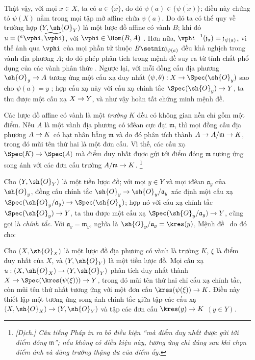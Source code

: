 \documentclass[oneside]{amsart}
\makeatletter
\newcommand{\ega@arrow}[2]{\mathchoice{#1}{#2}{#2}{#2}}
\renewcommand{\to}{\ega@arrow{\longrightarrow}{\rightarrow}}
\newcommand{\oldpage}[2][]{{\marginnote{\normalfont\textbf{#1}~|~#2}}\ignorespaces}
\let\EGAOriginalLabel\label
\renewcommand{\label}[1]{\phantomsection\EGAOriginalLabel{#1}}
\makeatother
\begin{document}
Thật vậy, với mọi $x\in X$, ta có $a\in\overline{\{x\}}$, do đó
$\psi(a)\in\overline{\{\psi(x)\}}$; điều này chứng tỏ $\psi(X)$ nằm
trong mọi tập mở affine chứa $\psi(a)$. Do đó ta có thể quy về trường
hợp $(Y,\sh{O}_Y)$ là một lược đồ affine có vành $B$; khi đó
$u=({}^a\vphi,\widetilde{\vphi})$, với $\vphi\in\Hom(B,A)$
. Hơn nữa,
$\vphi^{-1}(\mathfrak{j}_a)=\mathfrak{j}_{\psi(a)}$, vì thế ảnh qua
$\vphi$ của mọi phần tử thuộc $B\setmin\mathfrak{j}_{\psi(a)}$ đều khả
nghịch trong vành địa phương $A$; do đó phép phân tích trong mệnh đề suy
ra từ tính chất phổ dụng của các vành phân thức
. Ngược lại, với mỗi đồng cấu địa phương
$\sh{O}_y\to A$ tương ứng một cấu xạ duy nhất
$(\psi,\theta):X\to\Spec(\sh{O}_y)$ sao cho $\psi(a)=y$
; hợp cấu xạ này với cấu xạ chính tắc
$\Spec(\sh{O}_y)\to Y$, ta thu được một cấu xạ $X\to Y$, và như vậy
hoàn tất chứng minh mệnh đề.

\begin{env}[2.4.5]
\label{I.2.4.5}
Các lược đồ affine có vành là một \emph{trường} $K$ đều có không gian
nền chỉ gồm một điểm. Nếu $A$ là một vành địa phương có iđêan cực đại
$\mathfrak{m}$, thì mọi đồng cấu địa phương $A\to K$ có hạt nhân bằng
$\mathfrak{m}$ và do đó phân tích thành
$A\to A/\mathfrak{m}\to K$, trong đó mũi tên thứ hai là một đơn cấu. Vì
thế, các cấu xạ $\Spec(K)\to\Spec(A)$ mà điểm duy nhất được gửi tới điểm
đóng $\mathfrak{m}$ tương ứng song ánh với các đơn cấu trường
$A/\mathfrak{m}\to K$.
\footnote{\emph{[Dịch.] Câu tiếng Pháp in ra bỏ điều kiện ``mà điểm duy
nhất được gửi tới điểm đóng $\mathfrak{m}$''; nếu không có điều kiện
này, tương ứng chỉ đúng sau khi chọn điểm ảnh và dùng trường thặng dư
của điểm ấy.}}
\end{env}

Cho $(Y,\sh{O}_Y)$ là một tiền lược đồ; với mọi $y\in Y$ và mọi iđêan
$\mathfrak{a}_y$ của $\sh{O}_y$, đồng cấu chính tắc
$\sh{O}_y\to\sh{O}_y/\mathfrak{a}_y$ xác định một cấu xạ
$\Spec(\sh{O}_y/\mathfrak{a}_y)\to\Spec(\sh{O}_y)$; hợp nó với cấu xạ
chính tắc $\Spec(\sh{O}_y)\to Y$, ta thu được một cấu xạ
$\Spec(\sh{O}_y/\mathfrak{a}_y)\to Y$, cũng gọi là \emph{chính tắc}.
Với $\mathfrak{a}_y=\mathfrak{m}_y$, nghĩa là
$\sh{O}_y/\mathfrak{a}_y=\kres(y)$, Mệnh đề~ do đó cho:

\begin{corollary}[2.4.6]
\label{I.2.4.6}
\oldpage[I]{103}
Cho $(X,\sh{O}_X)$ là một lược đồ địa phương có vành là trường $K$,
$\xi$ là điểm duy nhất của $X$, và $(Y,\sh{O}_Y)$ là một tiền lược đồ.
Mọi cấu xạ $u:(X,\sh{O}_X)\to(Y,\sh{O}_Y)$ phân tích duy nhất thành
$X\to\Spec(\kres(\psi(\xi)))\to Y$, trong đó mũi tên thứ hai chỉ cấu xạ
chính tắc, còn mũi tên thứ nhất tương ứng với một đơn cấu
$\kres(\psi(\xi))\to K$. Điều này thiết lập một tương ứng song ánh chính
tắc giữa tập các cấu xạ $(X,\sh{O}_X)\to(Y,\sh{O}_Y)$ và tập các đơn
cấu $\kres(y)\to K$ $(y\in Y)$.
\end{corollary}
\end{document}
